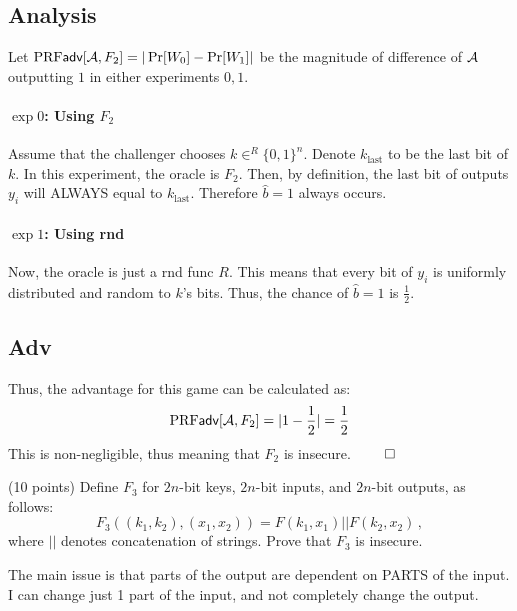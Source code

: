 \documentclass[12pt]{article}
\theoremstyle{plain}
\theoremstyle{definition}
\begin{document}
\begin{problem}
\begin{solution}
\subsection*{Analysis}
Let $\textrm{PRF}\textsf{adv}[\mathcal{A}, F_2] = |\Pr[W_0] - \Pr[W_1]|$ be the magnitude of difference of $\mathcal{A}$ outputting $1$ in either experiments $0, 1$.

\paragraph{$\exp 0$: Using $F_2$}
Assume that the challenger chooses $k \in^R \{0, 1\}^n$. Denote $k_{\text{last}}$ to be the last bit of $k$. In this experiment, the oracle is $F_2$. Then, by definition, the last bit of outputs $y_i$ will ALWAYS equal to $k_{\text{last}}$. Therefore $\hat{b} = 1$ always occurs.

\paragraph{$\exp 1$: Using rnd}
Now, the oracle is just a rnd func $R$. This means that every bit of $y_i$ is uniformly distributed and random to $k$'s bits. Thus, the chance of $\hat{b} = 1$ is $\frac{1}{2}$.

\subsection*{Adv}
Thus, the advantage for this game can be calculated as:
\begin{equation*}
  \textrm{PRF}\textsf{adv}[\mathcal{A}, F_2] = |1 - \frac{1}{2}| = \frac{1}{2}
\end{equation*}
This is non-negligible, thus meaning that $F_2$ is insecure. $\qed$
\end{solution}

\begin{ppart} (10 points)
Define $F_3$  for $2n$-bit keys, $2n$-bit inputs, and $2n$-bit outputs, as follows: 
\[
F_3((k_1, k_2), (x_1, x_2))=F(k_1, x_1)|| F(k_2, x_2)\,,
\]
where $||$ denotes concatenation of strings. Prove that $F_3$ is insecure.
\end{ppart}

\begin{solution}
  The main issue is that parts of the output are dependent on PARTS of the input. I can change just 1 part of the input, and not completely change the output.


\end{solution}
\end{problem}
\end{document}
